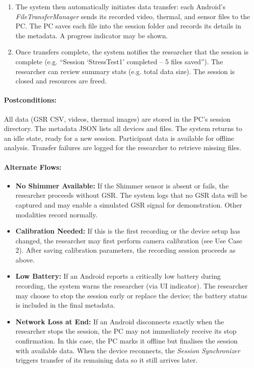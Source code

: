 \begin{enumerate}
    \item The system then automatically initiates data transfer: each Android’s \textit{FileTransferManager} sends its recorded video, thermal, and sensor files to the PC. The PC saves each file into the session folder and records its details in the metadata. A progress indicator may be shown.
    \item Once transfers complete, the system notifies the researcher that the session is complete (e.g. “Session ‘StressTest1’ completed – 5 files saved”). The researcher can review summary stats (e.g. total data size). The session is closed and resources are freed.
\end{enumerate}

\paragraph{Postconditions:} All data (GSR CSV, videos, thermal images) are stored in the PC's session directory. The metadata JSON lists all devices and files. The system returns to an idle state, ready for a new session. Participant data is available for offline analysis. Transfer failures are logged for the researcher to retrieve missing files.

\paragraph{Alternate Flows:}
\begin{itemize}
    \item \textbf{No Shimmer Available:} If the Shimmer sensor is absent or fails, the researcher proceeds without GSR. The system logs that no GSR data will be captured and may enable a simulated GSR signal for demonstration. Other modalities record normally.
    \item \textbf{Calibration Needed:} If this is the first recording or the device setup has changed, the researcher may first perform camera calibration (see Use Case 2). After saving calibration parameters, the recording session proceeds as above.
    \item \textbf{Low Battery:} If an Android reports a critically low battery during recording, the system warns the researcher (via UI indicator). The researcher may choose to stop the session early or replace the device; the battery status is included in the final metadata.
    \item \textbf{Network Loss at End:} If an Android disconnects exactly when the researcher stops the session, the PC may not immediately receive its stop confirmation. In this case, the PC marks it offline but finalises the session with available data. When the device reconnects, the \textit{Session Synchronizer} triggers transfer of its remaining data so it still arrives later.
\end{itemize}

